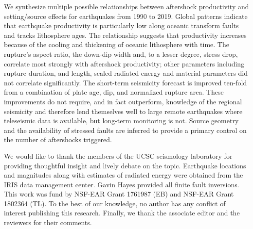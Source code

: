 \documentclass[draft, jgrga]{agujournal2018}
\begin{document}
We synthesize multiple possible relationships between aftershock productivity and setting/source effects for earthquakes from 1990 to 2019. Global patterns indicate that earthquake productivity is particularly low along oceanic transform faults and tracks lithosphere ages. The relationship suggests that productivity increases because of the cooling and thickening of oceanic lithosphere with time. The rupture's aspect ratio, the down-dip width and, to a lesser degree, stress drop, correlate most strongly with aftershock productivity; other parameters including rupture duration, and length, scaled radiated energy and material parameters did not correlate significantly. The short-term seismicity forecast is improved ten-fold from a combination of plate age, dip, and normalized rupture area. These improvements do not require, and in fact outperform, knowledge of the regional seismicity and therefore lend themselves well to large remote earthquakes where teleseismic data is available, but long-term monitoring is not. Source geometry and the availability of stressed faults are inferred to provide a primary control on the number of aftershocks triggered.

\acknowledgments

We would like to thank the members of the UCSC seismology laboratory for providing thoughtful insight and lively debate on the topic. Earthquake locations and magnitudes along with estimates of radiated energy were obtained from the IRIS data management center. Gavin Hayes provided all finite fault inversions. This work was fund by NSF-EAR Grant 1761987 (EB) and NSF-EAR Grant 1802364 (TL). To the best of our knowledge, no author has any conflict of interest publishing this research. Finally, we thank the associate editor and the reviewers for their comments.


\end{document}
